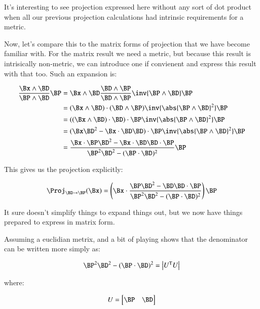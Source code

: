 \documentclass{article}      %
\newcommand{\T}[0]{\text{T}}
\begin{document}
It's interesting to see projection expressed here without any sort of dot
product when all our previous projection calculations had intrinsic
requirements for a metric.

Now, let's compare this to the matrix forms of projection that we have become familiar with.  For the matrix result we need a metric, but because
this result is intrisically non-metric, we can introduce one if convienent and express this result with that too.  Such an expansion is:

\begin{align*}
\frac{\Bx \wedge \BD}{\BP \wedge \BD} \BP
&=
\Bx \wedge \BD
\frac{\BD \wedge \BP}{\BD \wedge \BP}
\inv{\BP \wedge \BD}
\BP \\
&=
(\Bx \wedge \BD) \cdot (\BD \wedge \BP)
\inv{\abs{\BP \wedge \BD}^2}
\BP \\
&=
((\Bx \wedge \BD) \cdot \BD) \cdot \BP
\inv{\abs{\BP \wedge \BD}^2}
\BP \\
&=
(
\Bx \BD^2 - \Bx \cdot \BD \BD
) \cdot \BP
\inv{\abs{\BP \wedge \BD}^2}
\BP \\
&=
\frac{\Bx \cdot \BP \BD^2 - \Bx \cdot \BD \BD \cdot \BP}
{\BP^2 \BD^2 - (\BP \cdot \BD)^2
}
\BP \\
\end{align*}

This gives us the projection explicitly:

\begin{equation}\label{eqn:obliqueProjNearMatrixForm}
\Proj_{\BD \rightarrow \BP}(\Bx)
=
\left(\Bx \cdot \frac{\BP \BD^2 - \BD \BD \cdot \BP}{\BP^2 \BD^2 - (\BP \cdot \BD)^2}\right)
\BP
\end{equation}

It sure doesn't simplify things to expand things out, but we now have things prepared to express in matrix form.

Assuming a euclidian metrix, and a bit of playing shows that the denominator can be written more simply as:

\[
\BP^2 \BD^2 - (\BP \cdot \BD)^2 =
\begin{vmatrix}
U^\T U
\end{vmatrix}
\]

where:

\[
U =
\begin{bmatrix}
\BP & \BD \\
\end{bmatrix}
\]
\end{document}
